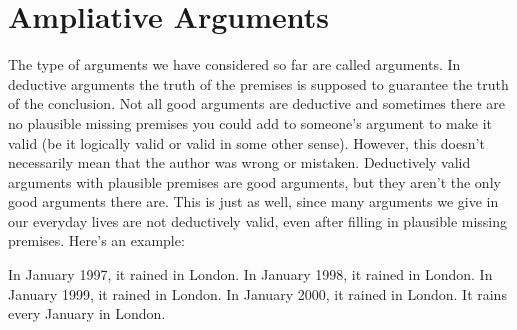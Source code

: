 %
%
%
%
%
%
%
%
%
%


\section{Ampliative Arguments}
The type of arguments we have considered so far are called  arguments. In deductive arguments the truth of the premises is supposed to guarantee the truth of the conclusion. Not all good arguments are deductive and sometimes there are no plausible missing premises you could add to someone's argument to make it valid (be it logically valid or valid in some other sense).
However, this doesn't necessarily mean that the author was wrong or mistaken.
Deductively valid arguments with plausible premises are good arguments, but they aren't the only good arguments there are. This is just as well, since many arguments we give in our everyday lives are not deductively valid, even after filling in plausible missing premises. Here's an example:
	\begin{earg}
		\prem In January 1997, it rained in London.
		\prem In January 1998, it rained in London.
		\prem In January 1999, it rained in London.
		\prem In January 2000, it rained in London.
	\conc It rains every January in London.
\end{earg}

